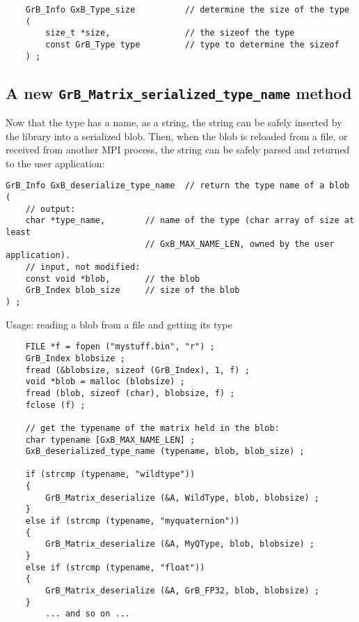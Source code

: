 \documentclass[12pt]{article}
\begin{document}
{\footnotesize
\begin{verbatim}
    GrB_Info GxB_Type_size          // determine the size of the type
    (
        size_t *size,               // the sizeof the type
        const GrB_Type type         // type to determine the sizeof
    ) ;
\end{verbatim}}

\subsection{A new {\tt GrB\_Matrix\_serialized\_type\_name} method}

Now that the type has a name, as a string, the string can be safely
inserted by the library into a serialized blob.  Then, when the blob is
reloaded from a file, or received from another MPI process, the string
can be safely parsed and returned to the user application:

{\footnotesize
\begin{verbatim}
GrB_Info GxB_deserialize_type_name  // return the type name of a blob
(
    // output:
    char *type_name,        // name of the type (char array of size at least
                            // GxB_MAX_NAME_LEN, owned by the user application).
    // input, not modified:
    const void *blob,       // the blob
    GrB_Index blob_size     // size of the blob
) ;
\end{verbatim}}

Usage: reading a blob from a file and getting its type

{\footnotesize
\begin{verbatim}
    FILE *f = fopen ("mystuff.bin", "r") ; 
    GrB_Index blobsize ;
    fread (&blobsize, sizeof (GrB_Index), 1, f) ;
    void *blob = malloc (blobsize) ;
    fread (blob, sizeof (char), blobsize, f) ;
    fclose (f) ;

    // get the typename of the matrix held in the blob:
    char typename [GxB_MAX_NAME_LEN] ;
    GxB_deserialized_type_name (typename, blob, blob_size) ;

    if (strcmp (typename, "wildtype"))
    {
        GrB_Matrix_deserialize (&A, WildType, blob, blobsize) ;
    }
    else if (strcmp (typename, "myquaternion"))
    {
        GrB_Matrix_deserialize (&A, MyQType, blob, blobsize) ;
    }
    else if (strcmp (typename, "float"))
    {
        GrB_Matrix_deserialize (&A, GrB_FP32, blob, blobsize) ;
    }
        ... and so on ...  \end{verbatim}}
\end{document}

